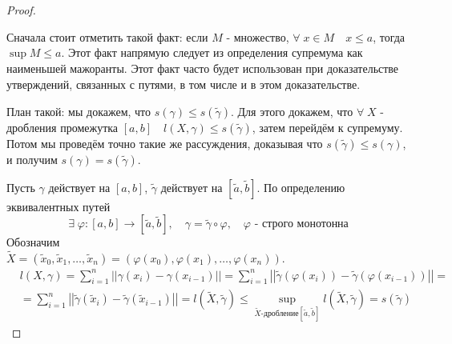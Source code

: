 \documentclass[../main.tex]{subfiles}
\begin{document}
\begin{proof}
    
    ~
    
    Сначала стоит отметить такой факт: если \( M\) - множество, \( \forall \; x \in M\quad x \leq a\), тогда \( \sup\limits_{ } M \leq a\). Этот факт напрямую следует из определения супремума как наименьшей мажоранты. Этот факт часто будет использован
    при доказательстве утверждений, связанных с путями, в том числе и в этом доказательстве. 
    
    План такой: мы докажем, что \( s\left( \gamma \right) \leq s\left( \tilde{ \gamma }\right)\). 
    Для этого докажем, что \( \forall \; X\) - дробления промежутка \( \left[ a,b\right]\quad l \left( X, \gamma \right) \leq s\left( \tilde{ \gamma }\right)\), затем перейдём к супремуму. Потом мы проведём точно такие же рассуждения, доказывая что \( s\left( \tilde{ \gamma }\right) \leq s\left( \gamma \right)\), и получим \( s\left( \gamma \right)=s\left( \tilde{ \gamma }\right)\).

    Пусть \( \gamma \) действует на \( \left[ a,b\right]\), \( \tilde{ \gamma }\) действует на \( [ \tilde{ a}, \tilde{ b}]\). По определению эквивалентных путей 
    \[ \exists \; \varphi : \left[ a,b\right] \longrightarrow [ \tilde{ a}, \tilde{ b}],\quad \gamma = \tilde{ \gamma }\circ \varphi ,\quad \varphi \text{ - строго монотонна}\]
    Обозначим \\\( \tilde{ X}=( \tilde{ x}_0, \tilde{ x}_1, \dots, \tilde{ x}_n)=( \varphi \left( x_0\right), \varphi \left( x_1\right), \dots, \varphi \left( x_n\right))\).
    \begin{equation*}
        \begin{aligned}
            &l \left( X, \gamma \right)= \sum\limits_{ i=1}^{ n} \left| \left| \gamma \left( x_i\right)- \gamma \left( x_{i-1}\right)\right|\right|= \sum\limits_{ i=1}^{ n} \left| \left| \tilde\gamma \left( \varphi \left( x_i\right)\right)- \tilde{ \gamma }\left( \varphi \left( x_{i-1}\right)\right)\right|\right|=\\ 
            &= \sum\limits_{ i=1}^{ n} \left| \left| \tilde{ \gamma }\left( \tilde{ x}_i\right)- \tilde{ \gamma }\left( \tilde{ x}_{i-1}\right)\right|\right|=l ( \tilde{ X}, \tilde{ \gamma }) \leq \sup\limits_{ \tilde{ X}\text{-дробление}[ \tilde{ a}, \tilde{ b}]} l ( \tilde{ X}, \tilde{ \gamma })=s\left( \tilde{ \gamma }\right)
        \end{aligned}
    \end{equation*}


\end{proof}
\end{document}
